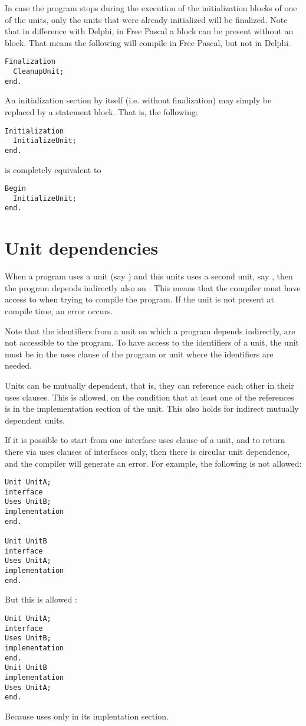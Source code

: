 In case the program stops during the execution of the initialization blocks
of one of the units, only the units that were already initialized will be
finalized.
Note that in difference with Delphi, in Free Pascal a  block can be 
present without an  block. That means the following will
compile in Free Pascal, but not in Delphi.
\begin{verbatim}
Finalization
  CleanupUnit;
end.
\end{verbatim}
An initialization section by itself (i.e. without finalization) may simply be 
replaced by a statement block. That is, the following:
\begin{verbatim}
Initialization
  InitializeUnit;
end.
\end{verbatim}
is completely equivalent to
\begin{verbatim}
Begin
  InitializeUnit;
end.
\end{verbatim}
\section{Unit dependencies}
When a program uses a unit (say ) and this units uses a second
unit, say , then the program depends indirectly also on
. This means that the compiler must have access to  when
trying to compile the program. If the unit is not present at compile time,
an error occurs.

Note that the identifiers from a unit on which a program depends indirectly,
are not accessible to the program. To have access to the identifiers of a
unit, the unit must be in the uses clause of the program or unit where the
identifiers are needed.

Units can be mutually dependent, that is, they can reference each other in
their uses clauses. This is allowed, on the condition that at least one of
the references is in the implementation section of the unit. This also holds
for indirect mutually dependent units.

If it is possible to start from one interface uses clause of a unit, and to return
there via uses clauses of interfaces only, then there is circular unit
dependence, and the compiler will generate an error.
For example, the following is not allowed:
\begin{verbatim}
Unit UnitA;
interface
Uses UnitB;
implementation
end.

Unit UnitB
interface
Uses UnitA;
implementation
end.
\end{verbatim}
But this is allowed :
\begin{verbatim}
Unit UnitA;
interface
Uses UnitB;
implementation
end.
Unit UnitB
implementation
Uses UnitA;
end.
\end{verbatim}
Because  uses  only in its implentation section.

